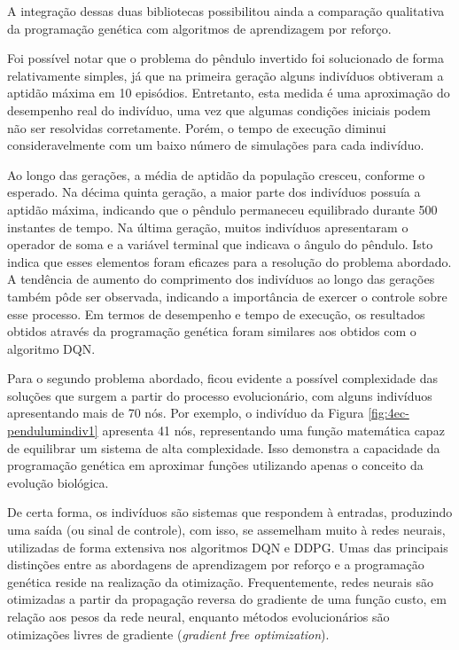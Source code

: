 A integração dessas duas bibliotecas possibilitou ainda a comparação qualitativa da programação genética com algoritmos de aprendizagem por reforço.

Foi possível notar que o problema do pêndulo invertido foi solucionado de forma relativamente simples, já que na primeira geração alguns indivíduos obtiveram a aptidão máxima em 10 episódios. Entretanto, esta medida é uma aproximação do desempenho real do indivíduo, uma vez que algumas condições iniciais podem não ser resolvidas corretamente. Porém, o tempo de execução diminui consideravelmente com um baixo número de simulações para cada indivíduo.

Ao longo das gerações, a média de aptidão da população cresceu, conforme o esperado. Na décima quinta geração, a maior parte dos indivíduos possuía a aptidão máxima, indicando que o pêndulo permaneceu equilibrado durante 500 instantes de tempo. Na última geração, muitos indivíduos apresentaram o operador de soma e a variável terminal que indicava o ângulo do pêndulo. Isto indica que esses elementos foram eficazes para a resolução do problema abordado. A tendência de aumento do comprimento dos indivíduos ao longo das gerações também pôde ser observada, indicando a importância de exercer o controle sobre esse processo. Em termos de desempenho e tempo de execução, os resultados obtidos através da programação genética foram similares aos obtidos com o algoritmo DQN.

Para o segundo problema abordado, ficou evidente a possível complexidade das soluções que surgem a partir do processo evolucionário, com alguns indivíduos apresentando mais de 70 nós. Por exemplo, o indivíduo da Figura \ref{fig:4ec-pendulumindiv1} apresenta 41 nós, representando uma função matemática capaz de equilibrar um sistema de alta complexidade. Isso demonstra a capacidade da programação genética em aproximar funções utilizando apenas o conceito da evolução biológica. 

De certa forma, os indivíduos são sistemas que respondem à entradas, produzindo uma saída (ou sinal de controle), com isso, se assemelham muito à redes neurais, utilizadas de forma extensiva nos algoritmos DQN e DDPG. Umas das principais distinções entre as abordagens de aprendizagem por reforço e a programação genética reside na realização da otimização. Frequentemente, redes neurais são otimizadas a partir da propagação reversa do gradiente de uma função custo, em relação aos pesos da rede neural, enquanto métodos evolucionários são otimizações livres de gradiente (\textit{gradient free optimization}).

